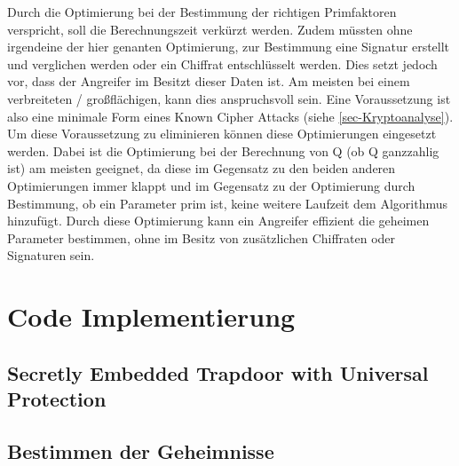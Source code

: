             Durch die Optimierung bei der Bestimmung der richtigen Primfaktoren verspricht, soll die Berechnungszeit verkürzt werden. Zudem müssten ohne irgendeine der hier genanten Optimierung, zur Bestimmung eine Signatur erstellt und verglichen werden oder ein Chiffrat entschlüsselt werden. Dies setzt jedoch vor, dass der Angreifer im Besitzt dieser Daten ist. Am meisten bei einem verbreiteten / großflächigen, kann dies anspruchsvoll sein. Eine Voraussetzung ist also eine minimale Form eines Known Cipher Attacks (siehe \ref{sec-Kryptoanalyse}).
            Um diese Voraussetzung zu eliminieren können diese Optimierungen eingesetzt werden. 
            Dabei ist die Optimierung bei der Berechnung von Q (ob Q ganzzahlig ist) am meisten geeignet, da diese im Gegensatz zu den beiden anderen Optimierungen immer klappt und im Gegensatz zu der Optimierung durch Bestimmung, ob ein Parameter prim ist, keine weitere Laufzeit dem Algorithmus hinzufügt.
            Durch diese Optimierung kann ein Angreifer effizient die geheimen Parameter bestimmen, ohne im Besitz von zusätzlichen Chiffraten oder Signaturen sein.

        
    \section{Code Implementierung}
        \subsection{Secretly Embedded Trapdoor with Universal Protection}

        \subsection{Bestimmen der Geheimnisse}